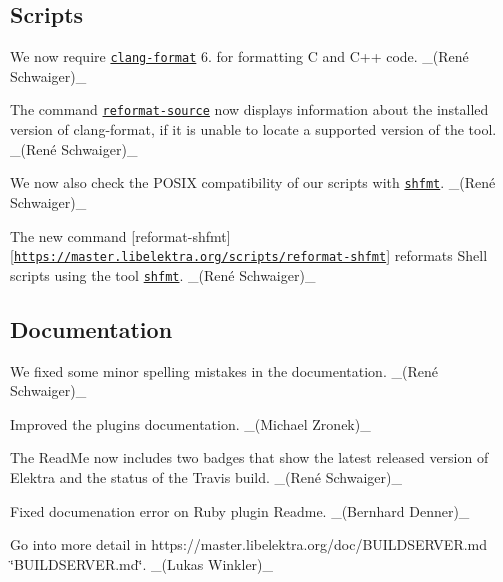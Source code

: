 \subsection*{Scripts}


\begin{DoxyItemize}
\item We now require \href{https://clang.llvm.org/docs/ClangFormat.html}{\tt {\ttfamily clang-\/format}} 6. for formatting C and C++ code. \+\_\+(René Schwaiger)\+\_\+
\item The command \href{https://master.libelektra.org/scripts/reformat-source}{\tt {\ttfamily reformat-\/source}} now displays information about the installed version of {\ttfamily clang-\/format}, if it is unable to locate a supported version of the tool. \+\_\+(René Schwaiger)\+\_\+
\item We now also check the P\+O\+S\+IX compatibility of our scripts with \href{https://github.com/mvdan/sh}{\tt {\ttfamily shfmt}}. \+\_\+(René Schwaiger)\+\_\+
\item The new command \mbox{[}{\ttfamily reformat-\/shfmt}\mbox{]}\mbox{[}\href{https://master.libelektra.org/scripts/reformat-shfmt}{\tt https\+://master.\+libelektra.\+org/scripts/reformat-\/shfmt}\mbox{]} reformats Shell scripts using the tool \href{https://github.com/mvdan/sh}{\tt {\ttfamily shfmt}}. \+\_\+(René Schwaiger)\+\_\+
\end{DoxyItemize}

\subsection*{Documentation}


\begin{DoxyItemize}
\item We fixed some minor spelling mistakes in the documentation. \+\_\+(René Schwaiger)\+\_\+
\item Improved the plugins documentation. \+\_\+(\+Michael Zronek)\+\_\+
\item The Read\+Me now includes two badges that show the latest released version of Elektra and the status of the Travis build. \+\_\+(René Schwaiger)\+\_\+
\item Fixed documenation error on Ruby plugin Readme. \+\_\+(\+Bernhard Denner)\+\_\+
\item Go into more detail in https\+://master.libelektra.\+org/doc/\+B\+U\+I\+L\+D\+S\+E\+R\+V\+ER.md \char`\"{}\+B\+U\+I\+L\+D\+S\+E\+R\+V\+E\+R.\+md\char`\"{}. \+\_\+(\+Lukas Winkler)\+\_\+
\end{DoxyItemize}

